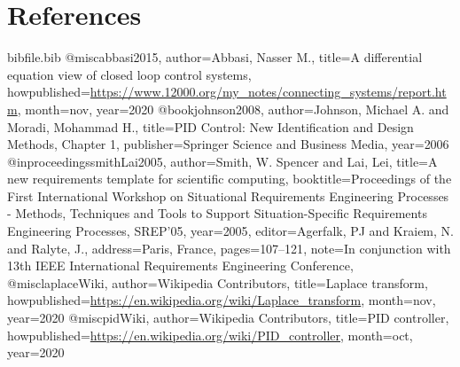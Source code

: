 \documentclass[12pt]{article}
\begin{document}
\section{References}
\label{Sec:References}
\begin{filecontents*}{bibfile.bib}
@misc{abbasi2015,
author={Abbasi, Nasser M.},
title={A differential equation view of closed loop control systems},
howpublished={\url{https://www.12000.org/my\_notes/connecting\_systems/report.htm}},
month=nov,
year={2020}}
@book{johnson2008,
author={Johnson, Michael A. and Moradi, Mohammad H.},
title={PID Control: New Identification and Design Methods, Chapter 1},
publisher={Springer Science and Business Media},
year={2006}}
@inproceedings{smithLai2005,
author={Smith, W. Spencer and Lai, Lei},
title={A new requirements template for scientific computing},
booktitle={Proceedings of the First International Workshop on Situational Requirements Engineering Processes - Methods, Techniques and Tools to Support Situation-Specific Requirements Engineering Processes, SREP'05},
year={2005},
editor={Agerfalk, PJ and Kraiem, N. and Ralyte, J.},
address={Paris, France},
pages={107--121},
note={In conjunction with 13th IEEE International Requirements Engineering Conference,}}
@misc{laplaceWiki,
author={Wikipedia Contributors},
title={Laplace transform},
howpublished={\url{https://en.wikipedia.org/wiki/Laplace\_transform}},
month=nov,
year={2020}}
@misc{pidWiki,
author={Wikipedia Contributors},
title={PID controller},
howpublished={\url{https://en.wikipedia.org/wiki/PID\_controller}},
month=oct,
year={2020}}
\end{filecontents*}
\nocite{*}
\printbibliography[heading=none]
\end{document}
